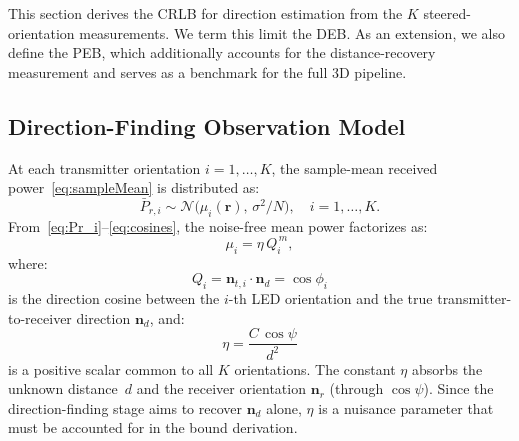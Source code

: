 \documentclass[journal]{IEEEtran}
\newcommand{\added}[1]{{\color{blue}#1}}
\begin{document}
\added{This section derives the CRLB for direction estimation from the $K$ steered-orientation measurements. We term this limit the DEB. As an extension, we also define the PEB, which additionally accounts for the distance-recovery measurement and serves as a benchmark for the full 3D pipeline.}

\added{\subsection{Direction-Finding Observation Model}
At each transmitter orientation $i=1,\ldots,K$, the sample-mean received power~\eqref{eq:sampleMean} is distributed as:
\begin{equation}
\bar P_{r,i} \sim 
  \mathcal{N}\!\bigl(\mu_{i}(\mathbf r),\,\sigma^{2}/N\bigr),
\quad i=1,\dots,K.
\end{equation}
From~\eqref{eq:Pr_i}--\eqref{eq:cosines}, the noise-free mean power factorizes as:
\begin{equation}
\mu_i = \eta\,Q_i^{\,m},
\label{eq:mu_factorized}
\end{equation}
where:
\begin{equation}
Q_i = \mathbf{n}_{t,i}\cdot\mathbf{n}_d = \cos\phi_i
\label{eq:Q}
\end{equation}
is the direction cosine between the $i$-th LED orientation and the true transmitter-to-receiver direction $\mathbf{n}_d$, and:
\begin{equation}
\eta = \frac{C\,\cos\psi}{d^2}
\label{eq:eta_nuisance}
\end{equation}
is a positive scalar common to all $K$ orientations.  The constant $\eta$ absorbs the unknown distance~$d$ and the receiver orientation $\mathbf{n}_r$ (through $\cos\psi$).  Since the direction-finding stage aims to recover $\mathbf{n}_d$ alone, $\eta$ is a nuisance parameter that must be accounted for in the bound derivation.}
\end{document}
